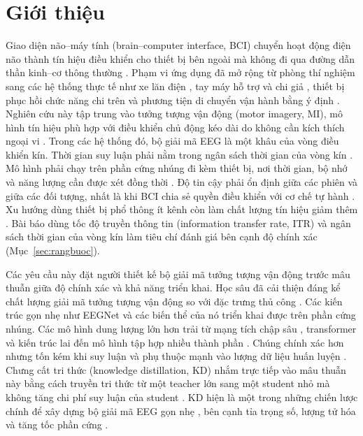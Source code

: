 \section{Giới thiệu}
\label{sec:gioithieu}

Giao diện não--máy tính (brain--computer interface, BCI) chuyển hoạt động
điện não thành tín hiệu điều khiển cho thiết bị bên ngoài mà không đi qua
đường dẫn thần kinh--cơ thông thường \cite{chen2025brain, tonin2021noninvasive,
ding2026brain}. Phạm vi ứng dụng đã mở rộng từ phòng thí nghiệm sang các hệ
thống thực tế \cite{varbu2022present, pang2024applications} như xe lăn điện
\cite{palumbo2021motorimagery, lei2022intention, mai2024hybrid}, tay máy hỗ
trợ và chi giả \cite{casey2021bci}, thiết bị phục hồi chức năng chi trên
\cite{baniqued2021brain} và phương tiện di chuyển vận hành bằng ý định
\cite{lu2020model}. Nghiên cứu này tập trung vào tưởng tượng vận động
(motor imagery, MI), mô hình tín hiệu phù hợp với điều khiển chủ động kéo
dài do không cần kích thích ngoại vi \cite{palumbo2021motorimagery}. Trong
các hệ thống đó, bộ giải mã EEG là một khâu của vòng điều khiển kín. Thời
gian suy luận phải nằm trong ngân sách thời gian của vòng kín
\cite{an2024development, tonin2020role}. Mô hình phải chạy trên phần cứng
nhúng đi kèm thiết bị, nơi thời gian, bộ nhớ và năng lượng cần được xét
đồng thời \cite{sun2025signal, akbari2025atrial, craighero2024ondevice,
wang2024mibminet, pacini2024design, sen2025lowlatency}. Độ tin cậy phải ổn định giữa các phiên và giữa các đối
tượng, nhất là khi BCI chia sẻ quyền điều khiển với cơ chế tự hành
\cite{choi2023asynchronous, deng2020selfadaptive, wei2023intra}. Xu hướng
dùng thiết bị phổ thông ít kênh còn làm chất lượng tín hiệu giảm thêm
\cite{wu2022deepbrain, tarara2025motor, paneru2025eeg}. Bài báo dùng tốc độ
truyền thông tin (information transfer rate, ITR) \cite{wolpaw2002brain} và
ngân sách thời gian của vòng kín làm tiêu chí đánh giá bên cạnh độ chính xác
(Mục~\ref{sec:rangbuoc}).

Các yêu cầu này đặt người thiết kế bộ giải mã tưởng tượng vận động trước mâu thuẫn giữa độ chính xác và khả năng triển khai. Học sâu đã cải
thiện đáng kể chất lượng giải mã tưởng tượng vận động so với đặc trưng thủ
công \cite{al-saegh2021deep, sadiq2021development}. Các kiến trúc gọn nhẹ
như EEGNet \cite{lawhern2018eegnet} và các biến thể của nó
\cite{ingolfsson2020eegtcnet, deng2021advanced, wang2022mieeg,
wang2023ifnet} triển khai được trên phần cứng nhúng. Các mô hình dung lượng lớn hơn trải từ mạng tích chập sâu
\cite{schirrmeister2017deep}, transformer và kiến trúc lai
\cite{vafaei2025transformers, zhao2024ctnet, ding2025eegdeformer,
altaheri2025temporal, wang20232d} đến mô hình tập hợp nhiều thành phần
\cite{zoumpourlis2024motor}. Chúng chính xác hơn nhưng tốn kém khi suy luận
và phụ thuộc mạnh vào lượng dữ liệu huấn luyện \cite{keutayeva2024data,
keutayeva2024compact}. Chưng cất tri thức (knowledge distillation, KD) nhắm
trực tiếp vào mâu thuẫn này bằng cách truyền tri thức từ một teacher lớn
sang một student nhỏ mà không tăng chi phí suy luận của student
\cite{hinton2015distilling}. KD hiện là một trong những chiến lược chính để
xây dựng bộ giải mã EEG gọn nhẹ \cite{li2025lightweight, zhou2026structural},
bên cạnh tỉa trọng số, lượng tử hóa và tăng tốc phần cứng
\cite{xie2024comprehensive}.

